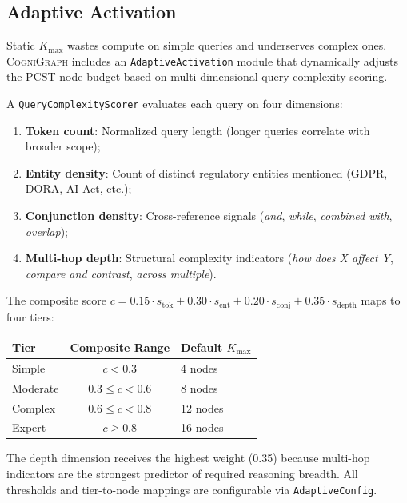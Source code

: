 \documentclass[a4paper,11pt]{article}
\theoremstyle{definition}
\newcommand{\cogni}{\textsc{CogniGraph}}
\begin{document}
\subsection{Adaptive Activation}
\label{sec:adaptive}

Static $K_{\max}$ wastes compute on simple queries and underserves complex ones.
\cogni{} includes an \texttt{AdaptiveActivation} module that dynamically adjusts the PCST node budget based on multi-dimensional query complexity scoring.

A \texttt{QueryComplexityScorer} evaluates each query on four dimensions:
\begin{enumerate}
\item \textbf{Token count}: Normalized query length (longer queries correlate with broader scope);
\item \textbf{Entity density}: Count of distinct regulatory entities mentioned (GDPR, DORA, AI Act, etc.);
\item \textbf{Conjunction density}: Cross-reference signals (\textit{and}, \textit{while}, \textit{combined with}, \textit{overlap});
\item \textbf{Multi-hop depth}: Structural complexity indicators (\textit{how does X affect Y}, \textit{compare and contrast}, \textit{across multiple}).
\end{enumerate}

The composite score $c = 0.15 \cdot s_{\text{tok}} + 0.30 \cdot s_{\text{ent}} + 0.20 \cdot s_{\text{conj}} + 0.35 \cdot s_{\text{depth}}$ maps to four tiers:

\begin{center}
\begin{tabular}{lcl}
\toprule
\textbf{Tier} & \textbf{Composite Range} & \textbf{Default $K_{\max}$} \\
\midrule
Simple & $c < 0.3$ & 4 nodes \\
Moderate & $0.3 \le c < 0.6$ & 8 nodes \\
Complex & $0.6 \le c < 0.8$ & 12 nodes \\
Expert & $c \ge 0.8$ & 16 nodes \\
\bottomrule
\end{tabular}
\end{center}

The depth dimension receives the highest weight (0.35) because multi-hop indicators are the strongest predictor of required reasoning breadth.
All thresholds and tier-to-node mappings are configurable via \texttt{AdaptiveConfig}.
\end{document}
